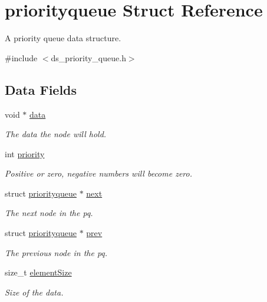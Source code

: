 \hypertarget{structpriorityqueue}{}\section{priorityqueue Struct Reference}
\label{structpriorityqueue}


A priority queue data structure.  




{\ttfamily \#include $<$ds\+\_\+priority\+\_\+queue.\+h$>$}

\subsection*{Data Fields}
\begin{DoxyCompactItemize}
\item 
void $\ast$ \hyperlink{structpriorityqueue_a735984d41155bc1032e09bece8f8d66d}{data}
\begin{DoxyCompactList}\small\item\em The data the node will hold. \end{DoxyCompactList}\item 
int \hyperlink{structpriorityqueue_acec9ce2df15222151ad66fcb1d74eb9f}{priority}
\begin{DoxyCompactList}\small\item\em Positive or zero, negative numbers will become zero. \end{DoxyCompactList}\item 
struct \hyperlink{structpriorityqueue}{priorityqueue} $\ast$ \hyperlink{structpriorityqueue_ad201c27ab3b5d056b515abec6484d679}{next}
\begin{DoxyCompactList}\small\item\em The next node in the pq. \end{DoxyCompactList}\item 
struct \hyperlink{structpriorityqueue}{priorityqueue} $\ast$ \hyperlink{structpriorityqueue_a21f8d5cee7f9863e99c26f3a3120efb7}{prev}
\begin{DoxyCompactList}\small\item\em The previous node in the pq. \end{DoxyCompactList}\item 
size\+\_\+t \hyperlink{structpriorityqueue_af884332e6713af9425451adde09e0024}{element\+Size}
\begin{DoxyCompactList}\small\item\em Size of the data. \end{DoxyCompactList}\end{DoxyCompactItemize}


